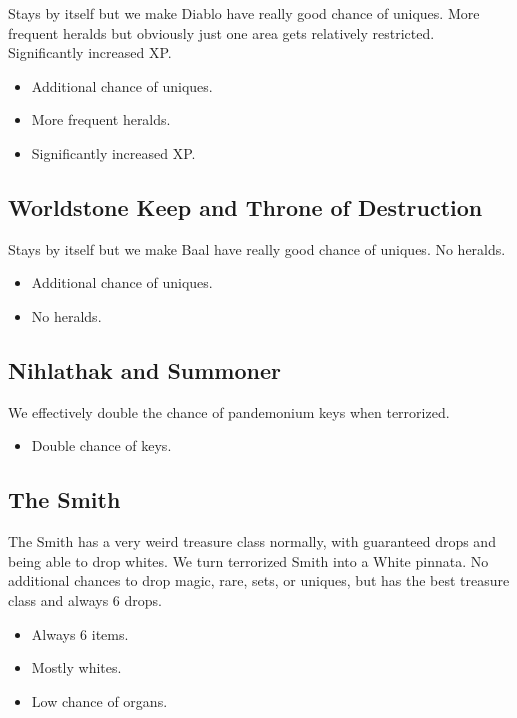 \documentclass[12pt,a4paper]{article}
\begin{document}
Stays by itself but we make Diablo have really good chance of uniques. More frequent heralds but obviously just one area gets relatively restricted. Significantly increased XP.

\begin{itemize}
\item Additional chance of uniques.
\item More frequent heralds.
\item Significantly increased XP.
\end{itemize}

\subsection{Worldstone Keep and Throne of Destruction}

Stays by itself but we make Baal have really good chance of uniques. No heralds.

\begin{itemize}
\item Additional chance of uniques.
\item No heralds.
\end{itemize}

\subsection{Nihlathak and Summoner}

We effectively double the chance of pandemonium keys when terrorized.

\begin{itemize}
\item Double chance of keys.
\end{itemize}

\subsection{The Smith}

The Smith has a very weird treasure class normally, with guaranteed drops and being able to drop whites. We turn terrorized Smith into a White pinnata. No additional chances to drop magic, rare, sets, or uniques, but has the best treasure class and always 6 drops.

\begin{itemize}
\item Always 6 items.
\item Mostly whites.
\item Low chance of organs.
\end{itemize}
\end{document}
